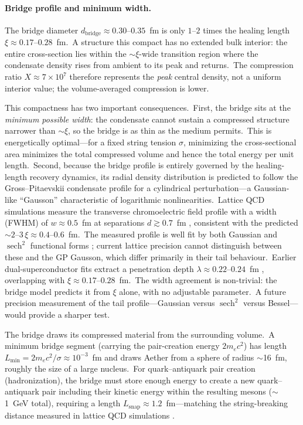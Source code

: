 ﻿\documentclass[12pt,letterpaper]{article}
\begin{document}
\paragraph{Bridge profile and minimum width.}
The bridge diameter $d_{\mathrm{bridge}} \approx 0.30$--$0.35$~fm is only
$1$--$2$ times the healing length $\xi \approx 0.17$--$0.28$~fm.\ A structure
this compact has no extended bulk interior: the entire cross-section lies within
the $\sim\!\xi$-wide transition region where the condensate density rises from
ambient to its peak and returns.\ The compression ratio $X \approx 7 \times 10^7$
therefore represents the \emph{peak} central density, not a uniform interior
value; the volume-averaged compression is lower.

This compactness has two important consequences.\ First, the bridge sits at the
\emph{minimum possible width}: the condensate cannot sustain a compressed
structure narrower than $\sim\!\xi$, so the bridge is as thin as the medium
permits.\ This is energetically optimal---for a fixed string tension $\sigma$,
minimizing the cross-sectional area minimizes the total compressed volume and
hence the total energy per unit length.\ Second, because the bridge profile is
entirely governed by the healing-length recovery dynamics, its radial density
distribution is predicted to follow the Gross--Pitaevskii condensate profile
for a cylindrical perturbation---a Gaussian-like ``Gausson'' characteristic of
logarithmic nonlinearities.\ Lattice QCD simulations measure the transverse
chromoelectric field profile with a width (FWHM) of $w \approx 0.5$~fm at
separations $d \gtrsim 0.7$~fm \cite{cardoso2013,cea2024}, consistent with
the predicted $\sim\!2$--$3\,\xi \approx 0.4$--$0.6$~fm.\ The measured
profile is well fit by both Gaussian and $\operatorname{sech}^2$ functional
forms \cite{cea2024}; current lattice precision cannot distinguish between
these and the GP Gausson, which differ primarily in their tail behaviour.\
Earlier dual-superconductor fits extract a penetration depth
$\lambda \approx 0.22$--$0.24$~fm \cite{cea2012}, overlapping with
$\xi \approx 0.17$--$0.28$~fm.\ The width agreement is non-trivial: the
bridge model predicts it from $\xi$ alone, with no adjustable parameter.\
A future precision measurement of the tail profile---Gaussian versus
$\operatorname{sech}^2$ versus Bessel---would provide a sharper test.

The bridge draws its compressed material from the surrounding volume.\ A
minimum bridge segment (carrying the pair-creation energy $2m_e c^2$) has
length $L_{\min} = 2m_e c^2/\sigma \approx 10^{-3}$~fm and draws Aether from a
sphere of radius $\sim$16~fm, roughly the size of a large nucleus.\ For
quark--antiquark pair creation (hadronization), the bridge must store
enough energy to create a new quark--antiquark pair including
their kinetic energy within the resulting mesons ($\sim$1~GeV total),
requiring a length $L_{\mathrm{snap}} \approx 1.2$~fm---matching the
string-breaking distance measured in lattice QCD simulations
\cite{bali2005,bulava2019}.
\end{document}
